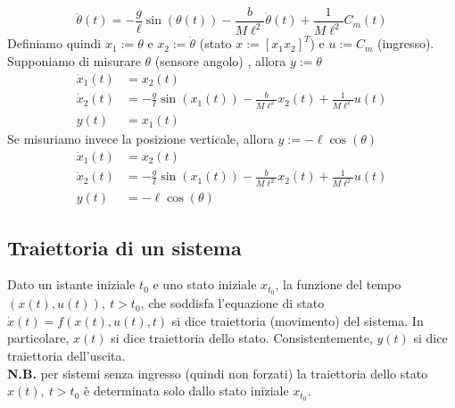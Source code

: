 \documentclass{article}
\numberwithin{equation}{subsection}
\let\oldsubsection\subsection%
\renewcommand{\subsection}{%
  \renewcommand{\theequation}{\thesubsection.\arabic{equation}}%
  \oldsubsection}%
\begin{document}
\begin{equation}
    \ddot \theta(t) = -\frac{g}{\ell} \sin \left(\theta(t)\right) - \frac{b}{M \ell^2} \dot \theta(t) + \frac{1}{M \ell^2} C_m(t)
\end{equation}
Definiamo quindi $x_1 := \theta$ e $x_2 := \dot \theta$ (stato $x:= [x_1x_2]^T$) e $u := C_m$ (ingresso).\\
Supponiamo di misurare $\theta$ (sensore angolo) , allora $y := \theta$
\begin{align*}
    \dot x_1 (t) &= x_2(t)\\
    \dot x_2(t) &= -\frac{g}{\ell} \sin \left(x_1(t)\right) - \frac{b}{M \ell^2} x_2(t) + \frac{1}{M \ell^2} u(t)\\
    y(t) &= x_1(t)
\end{align*}
Se misuriamo invece la posizione verticale, allora $y := - \ell \cos(\theta)$ 
\begin{align*}
    \dot x_1 (t) &= x_2(t)\\
    \dot x_2(t) &= -\frac{g}{\ell} \sin \left(x_1(t)\right) - \frac{b}{M \ell^2} x_2(t) + \frac{1}{M \ell^2} u(t)\\
    y(t) &= - \ell \cos(\theta)
\end{align*}



\subsection{Traiettoria di un sistema}
Dato un istante iniziale $t_0$ e uno stato iniziale $x_{t_0}$, la funzione del tempo $(x(t), u(t)), \ t>t_0$, che soddisfa l'equazione di stato $\dot x(t) = f (x(t), u(t), t)$ si dice traiettoria (movimento) del sistema. In particolare, $x(t)$ si dice traiettoria dello stato. Consistentemente, $y(t)$ si dice traiettoria dell'uscita.
\vspace*{0.2cm}\\
\textbf{N.B.} per sistemi senza ingresso (quindi non forzati) la traiettoria dello stato $x(t), \ t>t_0$ è determinata solo dallo stato iniziale $x_{t_0}$.
\end{document}
